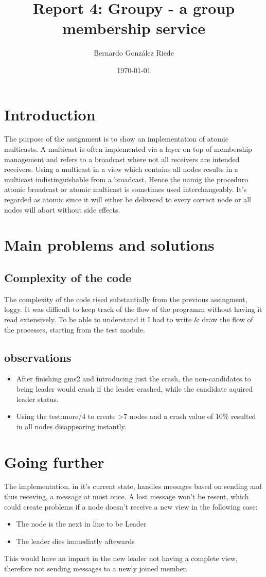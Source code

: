 \documentclass[a4paper, 11pt]{article}
\title{Report 4: Groupy - a group membership service}
\author{Bernardo González Riede}
\date{\today{}}
\begin{document}
\maketitle

\section{Introduction}
The purpose of the assignment is to show an implementation of atomic multicasts.
A multicast is often implemented via a layer on top of membership management and refers to a broadcast where not all receivers are intended receivers.
Using a multicast in a view which contains all nodes results in a multicast indistinguishable from a broadcast.
Hence the namig the proceduro atomic broadcast or atomic multicast is sometimes used interchangeably.
It's regarded as atomic since it will either be delivered to every correct node or all nodes will abort without side effects.




\section{Main problems and solutions}
\subsection{Complexity of the code}
The complexity of the code rised substantially from the previous assingment, loggy.
It was difficult to keep track of the flow of the programm without having it read extensively.
To be able to understand it I had to write \& draw the flow of the processes, starting from the test module.

\subsection{observations}
\begin{itemize}
    \item After finishing gms2 and introducing just the crash, the non-candidates to being leader would crash if the leader crashed, while the candidate aquired leader status.
    \item Using the test:more/4 to create \textgreater 7 nodes and a crash value of 10\% resulted in all nodes disappearing instantly.
\end{itemize}

\section{Going further}
The implementation, in it's current state, handles messages based on sending and thus receving, a message at most once.
A lost message won't be resent, which could create problems if a node doesn't receive a new view in the following case:
\begin{itemize}
    \item The node is the next in line to be Leader
    \item The leader dies immediatly aftewards
\end{itemize}
This would have an impact in the new leader not having a complete view, therefore not sending messages to a newly joined member.
\end{document}
